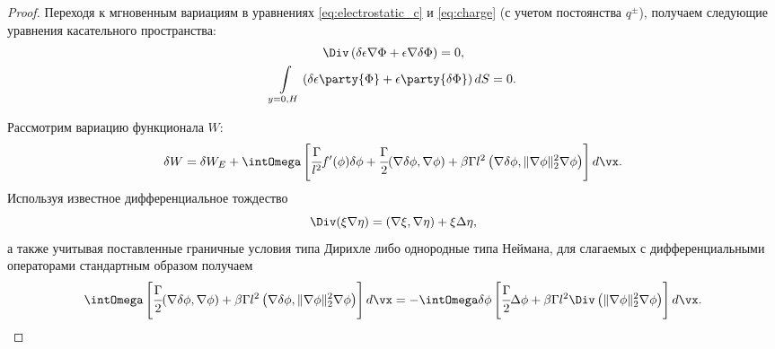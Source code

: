 \begin{proof}
Переходя к мгновенным вариациям в уравнениях \eqref{eq:electrostatic_c} и \eqref{eq:charge} (с учетом постоянства $q^\pm$), получаем следующие уравнения касательного пространства:
\begin{gather}
    \Div \left( \delta \epsilon \nabla \Phi + \epsilon \nabla \delta \Phi \right) = 0,
    \label{eq:tangent_instant_rho} \\
    \int\limits_{y = 0, H} \left( \delta \epsilon \party{\Phi} + \epsilon \party{\delta \Phi} \right) dS = 0.
    \label{eq:tangent_instant_charge}
\end{gather}

Рассмотрим вариацию функционала $W$:
\begin{equation}
    \delta W = \delta W_E + \intOmega \left[ \cfrac{\Gamma}{l^2} f'(\phi) \delta \phi + \cfrac{\Gamma}{2} (\nabla \delta \phi, \nabla \phi) + \beta \Gamma l^2 \left( \nabla \delta \phi, \| \nabla \phi \|_2^2 \nabla \phi \right) \right] d \vx.
    \label{eq:delta_energy}
\end{equation}
Используя известное дифференциальное тождество
\[
    \Div(\xi \nabla \eta) = (\nabla \xi, \nabla \eta) + \xi \Delta \eta,
\]
а также учитывая поставленные граничные условия типа Дирихле либо однородные типа Неймана, для слагаемых с дифференциальными операторами стандартным образом получаем
\begin{equation}
    \intOmega \left[ \cfrac{\Gamma}{2} (\nabla \delta \phi, \nabla \phi) + \beta \Gamma l^2 \left( \nabla \delta \phi, \| \nabla \phi \|_2^2 \nabla \phi \right) \right] d \vx = -\intOmega \delta \phi \left[ \cfrac{\Gamma}{2} \Delta \phi + \beta \Gamma l^2 \Div \left(\| \nabla \phi \|_2^2 \nabla \phi \right) \right] d \vx.
    \label{tmp:delta_energy_differential}
\end{equation}


\end{proof}
